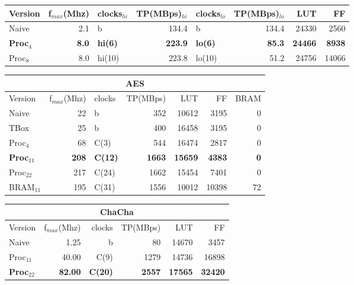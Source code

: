 \begin{frame}
\begin{minipage}[b]{0.65\textwidth}
\begin{tabular}{l r l r l r r r}
\hline
Version & f$_{max}$(Mhz) & clocks$_{hi}$ & TP(MBps)$_{hi}$ &clocks$_{lo}$ & TP(MBps)$_{lo}$ & LUT & FF\\
\hline
Naive    & 2.1 & b & 134.4 & b &  134.4 & 24330 & 2560\\
\textbf{Proc}$_{4}$ & \textbf{8.0} & \textbf{hi(6)} &        \textbf{223.9} & \textbf{lo(6)} & \textbf{85.3} & \textbf{24466} & \textbf{8938}\\
Proc$_{8}$ & 8.0 & hi(10) &       223.8 & lo(10) & 51.2 & 24756 & 14066\\
\end{tabular}
\begin{tabular}{l r l r r r r}
\multicolumn{7}{c}{AES}\\
\hline
Version & f$_{max}$(Mhz) & clocks & TP(MBps) & LUT & FF & BRAM\\
\hline
Naive      &   22 & b          & 352    & 10612     &  3195 & 0\\
TBox       &  25 & b           & 400 & 16458 & 3195 & 0\\
Proc$_{4}$  &  68 & C(3) &        544 & 16474 & 2817 & 0\\
\textbf{Proc}$_{11}$ & \textbf{208} & \textbf{C(12)} &      \textbf{1663} & \textbf{15659} & \textbf{4383} & \textbf{0}\\
Proc$_{22}$ & 217 & C(24) &      1662 & 15454 & 7401 & 0\\
BRAM$_{11}$ & 195 & C(31)  &     1556 & 10012 & 10398 & 72
\end{tabular}
\begin{tabular}{l r r r r r}
\multicolumn{6}{c}{ChaCha}\\
\hline
Version & f$_{max}$(Mhz) & clocks & TP(MBps) & LUT & FF\\
\hline
Naive  & 1.25 & b & 80           & 14670 & 3457\\
Proc$_{11}$ & 40.00 & C(9) & 1279 &  14736 & 16898\\
\textbf{Proc}$_{22}$ & \textbf{82.00} & \textbf{C(20)} & \textbf{2557} & \textbf{17565} & \textbf{32420}\\
\end{tabular}
\end{minipage}
\end{frame}

